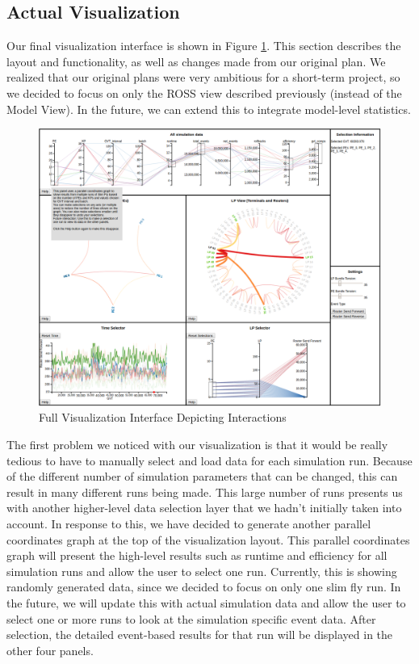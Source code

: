 \documentclass{acm_proc_article-sp}
\begin{document}
\subsection{Actual Visualization}
Our final visualization interface is shown in Figure \ref{actual-vis}.  This section describes the layout and functionality, as well as changes made from our original plan.  We realized that our original plans were very ambitious for a short-term project, so we decided to focus on only the ROSS view described previously (instead of the Model View).  In the future, we can extend this to integrate model-level statistics.  

\begin{figure}[t]
\centering
   \includegraphics[width=6.5in]{Interactive.png}
\caption{Full Visualization Interface Depicting Interactions}
\label{actual-vis}
\end{figure}

The first problem we noticed with our visualization is that it would be really tedious to have to manually select and load data for each simulation run.  Because of the different number of simulation parameters that can be changed, this can result in many different runs being made.  This large number of runs presents us with another higher-level data selection layer that we hadn't initially taken into account.  In response to this, we have decided to generate another parallel coordinates graph at the top of the visualization layout. This parallel coordinates graph will present the high-level results such as runtime and efficiency for all simulation runs and allow the user to select one run. Currently, this is showing randomly generated data, since we decided to focus on only one slim fly run.  In the future, we will update this with actual simulation data and allow the user to select one or more runs to look at the simulation specific event data. After selection, the  detailed event-based results for that run will be displayed in the other four panels.
\end{document}
